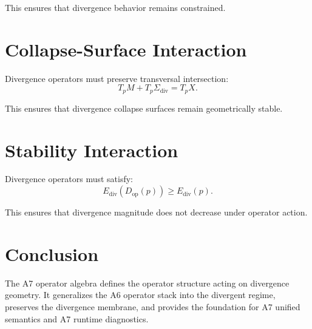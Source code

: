 \documentclass[11pt]{article}
\begin{document}
This ensures that divergence behavior remains constrained.

\section{Collapse-Surface Interaction}
Divergence operators must preserve transversal intersection:
\[
T_p M + T_p \Sigma_{\text{div}} = T_p X.
\]

This ensures that divergence collapse surfaces remain geometrically stable.

\section{Stability Interaction}
Divergence operators must satisfy:
\[
E_{\text{div}}(D_{\text{op}}(p)) \geq E_{\text{div}}(p).
\]

This ensures that divergence magnitude does not decrease under operator action.

\section*{Conclusion}
The A7 operator algebra defines the operator structure acting on divergence
geometry. It generalizes the A6 operator stack into the divergent regime,
preserves the divergence membrane, and provides the foundation for A7 unified
semantics and A7 runtime diagnostics.
\end{document}
